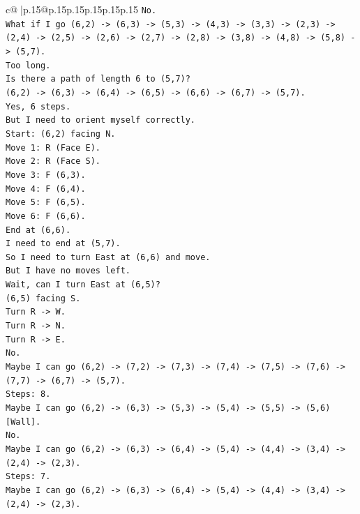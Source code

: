 \documentclass{article}
\begin{document}
{\begin{supertabular}{c@{$\;$}|p{.15\linewidth}@{}p{.15\linewidth}p{.15\linewidth}p{.15\linewidth}p{.15\linewidth}p{.15\linewidth}}
{{{\texttt{No.} \\
\texttt{What if I go (6,2) {-}> (6,3) {-}> (5,3) {-}> (4,3) {-}> (3,3) {-}> (2,3) {-}> (2,4) {-}> (2,5) {-}> (2,6) {-}> (2,7) {-}> (2,8) {-}> (3,8) {-}> (4,8) {-}> (5,8) {-}> (5,7).} \\
\texttt{Too long.} \\
\texttt{Is there a path of length 6 to (5,7)?} \\
\texttt{(6,2) {-}> (6,3) {-}> (6,4) {-}> (6,5) {-}> (6,6) {-}> (6,7) {-}> (5,7).} \\
\texttt{Yes, 6 steps.} \\
\texttt{But I need to orient myself correctly.} \\
\texttt{Start: (6,2) facing N.} \\
\texttt{Move 1: R (Face E).} \\
\texttt{Move 2: R (Face S).} \\
\texttt{Move 3: F (6,3).} \\
\texttt{Move 4: F (6,4).} \\
\texttt{Move 5: F (6,5).} \\
\texttt{Move 6: F (6,6).} \\
\texttt{End at (6,6).} \\
\texttt{I need to end at (5,7).} \\
\texttt{So I need to turn East at (6,6) and move.} \\
\texttt{But I have no moves left.} \\
\texttt{Wait, can I turn East at (6,5)?} \\
\texttt{(6,5) facing S.} \\
\texttt{Turn R {-}> W.} \\
\texttt{Turn R {-}> N.} \\
\texttt{Turn R {-}> E.} \\
\texttt{No.} \\
\texttt{Maybe I can go (6,2) {-}> (7,2) {-}> (7,3) {-}> (7,4) {-}> (7,5) {-}> (7,6) {-}> (7,7) {-}> (6,7) {-}> (5,7).} \\
\texttt{Steps: 8.} \\
\texttt{Maybe I can go (6,2) {-}> (6,3) {-}> (5,3) {-}> (5,4) {-}> (5,5) {-}> (5,6) {[}Wall{]}.} \\
\texttt{No.} \\
\texttt{Maybe I can go (6,2) {-}> (6,3) {-}> (6,4) {-}> (5,4) {-}> (4,4) {-}> (3,4) {-}> (2,4) {-}> (2,3).} \\
\texttt{Steps: 7.} \\
\texttt{Maybe I can go (6,2) {-}> (6,3) {-}> (6,4) {-}> (5,4) {-}> (4,4) {-}> (3,4) {-}> (2,4) {-}> (2,3).} \\
}}}
\end{supertabular}}
\end{document}
